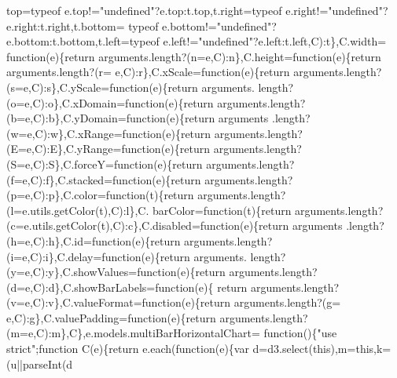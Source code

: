 \begin{DoxyCode}
      top=typeof e.top!=\textcolor{stringliteral}{"undefined"}?e.top:t.top,t.right=typeof e.right!=\textcolor{stringliteral}{"undefined"}?e.right:t.right,t.bottom=
      typeof e.bottom!=\textcolor{stringliteral}{"undefined"}?e.bottom:t.bottom,t.left=typeof e.left!=\textcolor{stringliteral}{"undefined"}?e.left:t.left,C):t\},C.width=\textcolor{keyword}{
      function}(e)\{\textcolor{keywordflow}{return} arguments.length?(n=e,C):n\},C.height=\textcolor{keyword}{function}(e)\{\textcolor{keywordflow}{return} arguments.length?(r=
      e,C):r\},C.xScale=\textcolor{keyword}{function}(e)\{\textcolor{keywordflow}{return} arguments.length?(s=e,C):s\},C.yScale=\textcolor{keyword}{function}(e)\{\textcolor{keywordflow}{return} arguments.
      length?(o=e,C):o\},C.xDomain=\textcolor{keyword}{function}(e)\{\textcolor{keywordflow}{return} arguments.length?(b=e,C):b\},C.yDomain=\textcolor{keyword}{function}(e)\{\textcolor{keywordflow}{return} arguments
      .length?(w=e,C):w\},C.xRange=\textcolor{keyword}{function}(e)\{\textcolor{keywordflow}{return} arguments.length?(E=e,C):E\},C.yRange=\textcolor{keyword}{function}(e)\{\textcolor{keywordflow}{return} 
      arguments.length?(S=e,C):S\},C.forceY=\textcolor{keyword}{function}(e)\{\textcolor{keywordflow}{return} arguments.length?(f=e,C):f\},C.stacked=\textcolor{keyword}{function}(e)\{\textcolor{keywordflow}{return} 
      arguments.length?(p=e,C):p\},C.color=\textcolor{keyword}{function}(t)\{\textcolor{keywordflow}{return} arguments.length?(l=e.utils.getColor(t),C):l\},C.
      barColor=\textcolor{keyword}{function}(t)\{\textcolor{keywordflow}{return} arguments.length?(c=e.utils.getColor(t),C):c\},C.disabled=\textcolor{keyword}{function}(e)\{\textcolor{keywordflow}{return} arguments
      .length?(h=e,C):h\},C.id=\textcolor{keyword}{function}(e)\{\textcolor{keywordflow}{return} arguments.length?(i=e,C):i\},C.delay=\textcolor{keyword}{function}(e)\{\textcolor{keywordflow}{return} arguments.
      length?(y=e,C):y\},C.showValues=\textcolor{keyword}{function}(e)\{\textcolor{keywordflow}{return} arguments.length?(d=e,C):d\},C.showBarLabels=\textcolor{keyword}{function}(e)\{\textcolor{keywordflow}{
      return} arguments.length?(v=e,C):v\},C.valueFormat=\textcolor{keyword}{function}(e)\{\textcolor{keywordflow}{return} arguments.length?(g=
      e,C):g\},C.valuePadding=\textcolor{keyword}{function}(e)\{\textcolor{keywordflow}{return} arguments.length?(m=e,C):m\},C\},e.models.multiBarHorizontalChart=\textcolor{keyword}{
      function}()\{\textcolor{stringliteral}{"use strict"};\textcolor{keyword}{function} C(e)\{\textcolor{keywordflow}{return} e.each(\textcolor{keyword}{function}(e)\{var d=d3.select(\textcolor{keyword}{this}),m=\textcolor{keyword}{this},k=(u||parseInt(d

\end{DoxyCode}
